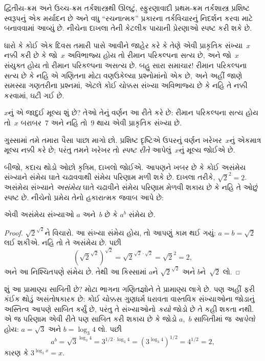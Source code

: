 \begingroup
\makeatletter{}\makeatother


\label{guunit:OLP-0179}


દ્વિતીય-ક્રમ અને ઉચ્ચ-ક્રમ તર્કશાસ્ત્રથી ઊલટું, સ્ફુરણાવાદી
પ્રથમ-ક્રમ તર્કશાસ્ત્ર પ્રશિષ્ટ સ્વરૂપનું એક મર્યાદન છે અને વધુ
``રચનાત્મક'' પ્રકારના તર્કવિચારનું નિદર્શન કરવા માટે બનાવવામાં આવ્યું
છે. નીચેના દાખલા તેની કેટલીક પાયાની પ્રેરણાઓ સ્પષ્ટ કરી શકે છે.

ધારો કે કોઈ એક દિવસ તમારી પાસે આવીને જાહેર કરે કે તેણે એવી પ્રાકૃતિક
સંખ્યા~$x$ નક્કી કરી છે કે જો~$x$ અવિભાજ્ય હોય તો રીમાન પરિકલ્પના સત્ય
છે, અને જો~$x$ સંયુક્ત હોય તો રીમાન પરિકલ્પના અસત્ય છે. બહુ સારા
સમાચાર!{} રીમાન પરિકલ્પના સત્ય છે કે નહિ એ ગણિતના મોટા વણઉકેલ્યા
પ્રશ્નોમાંનો એક છે, અને અહીં જાણે સમસ્યા ગણતરીના પ્રશ્નમાં, એટલે કોઈ
ચોક્કસ સંખ્યા અવિભાજ્ય છે કે નહિ તે નક્કી કરવામાં, ઘટી ગઈ છે.

$x$નું એ જાદુઈ મૂલ્ય શું છે? તેઓ તેનું વર્ણન આ રીતે કરે છે: રીમાન
પરિકલ્પના સત્ય હોય તો~$x$ બરાબર~$7$ અને નહિ તો~$9$ થાય એવી પ્રાકૃતિક
સંખ્યા છે.

ગુસ્સામાં તમે તમારા પૈસા પાછા માગો છો. પ્રશિષ્ટ દૃષ્ટિએ ઉપરનું વર્ણન
ખરેખર~$x$નું એકમાત્ર મૂલ્ય નક્કી કરે છે; પરંતુ તમને ખરેખર તો
\emph{સ્પષ્ટ રીતે} આપેલું~$x$નું મૂલ્ય જોઈએ છે.

બીજો, કદાચ થોડો ઓછો કૃત્રિમ, દાખલો જોઈએ. આપણને ખબર છે કે કોઈ અસંમેય
સંખ્યાને સંમેય ઘાતે ચઢાવવાથી સંમેય પરિણામ મળી શકે છે. દાખલા તરીકે,
$\sqrt{2}^2 = 2$. અસંમેય સંખ્યાને \emph{અસંમેય} ઘાતે ચઢાવીને સંમેય
પરિણામ મેળવી શકાય છે કે નહિ તે ઓછું સ્પષ્ટ છે. નીચેનો પ્રમેય તેનો
હકારાત્મક જવાબ આપે છે:

\begin{thm}
એવી અસંમેય સંખ્યાઓ $a$ અને~$b$ છે કે $a^b$ સંમેય છે.
\end{thm}

\begin{proof}
$\sqrt{2}^{\sqrt{2}}$ને વિચારો. આ સંખ્યા સંમેય હોય, તો આપણું કામ થઈ
ગયું: $a = b = \sqrt{2}$ લઈ શકીએ. નહિ તો તે અસંમેય છે. પછી
\[
(\sqrt{2}^{\sqrt{2}})^{\sqrt{2}} = \sqrt{2}^{\sqrt{2} \cdot
  \sqrt{2}} = \sqrt{2}^2 = 2,
\]
અને આ નિશ્ચિતપણે સંમેય છે. તેથી આ કિસ્સામાં $a$ને
$\sqrt{2}^{\sqrt{2}}$ અને $b$ને~$\sqrt 2$ લો.
\end{proof}

શું આ પ્રામાણ્ય સાબિતી છે? મોટા ભાગના ગણિતજ્ઞોને તે પ્રામાણ્ય લાગે છે.
પણ અહીં ફરી કંઈક થોડું અસંતોષકારક છે: કોઈ ચોક્કસ ગુણધર્મ ધરાવતા
વાસ્તવિક સંખ્યાઓના જોડાનું અસ્તિત્વ આપણે સાબિત કર્યું છે, પરંતુ તે
સંખ્યાઓનો \emph{કયો} જોડો છે તે કહી શકતા નથી. એ જ પરિણામ એવી રીતે પણ
સાબિત કરી શકાય છે કે જોડો $a$,~$b$ સાબિતીમાં જ \emph{આપેલો} હોય:
$a = \sqrt{3}$ અને $b = \log_3 4$ લો. પછી
\[
a^b = \sqrt{3}^{\log_3 4} = 3^{1/2 \cdot \log_3 4} = (3^{\log_3
  4})^{1/2} = 4^{1/2}= 2,
\]
કારણ કે $3^{\log_3 x} = x$.

